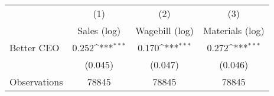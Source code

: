 {
\def\sym#1{\ifmmode^{#1}\else\(^{#1}\)\fi}
\begin{tabular}{l*{3}{c}}
\hline\hline
                    &\multicolumn{1}{c}{(1)}&\multicolumn{1}{c}{(2)}&\multicolumn{1}{c}{(3)}\\
                    &\multicolumn{1}{c}{Sales (log)}&\multicolumn{1}{c}{Wagebill (log)}&\multicolumn{1}{c}{Materials (log)}\\
\hline
Better CEO          &       0.252\sym{***}&       0.170\sym{***}&       0.272\sym{***}\\
                    &     (0.045)         &     (0.047)         &     (0.046)         \\
\hline
Observations        &       78845         &       78845         &       78845         \\
\hline\hline
\end{tabular}
}
